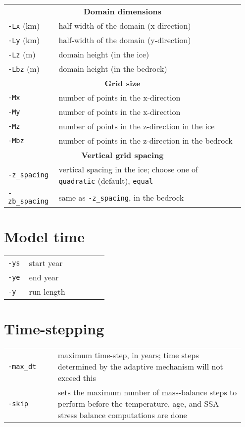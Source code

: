 \documentclass[landscape]{article}
\newcommand{\tabletitle}[1]{\multicolumn{2}{c}{\textbf{#1}}}
\begin{document}
\begin{textblock}{15}
\begin{tabular}{@{}p{0.2\linewidth}p{0.75\linewidth}@{}}
\tabletitle{Domain dimensions} \\
 \texttt{-Lx} (km) & half-width of the domain \mbox{(x-direction)}\\
  \texttt{-Ly} (km) & half-width of the domain \mbox{(y-direction)}\\
  \texttt{-Lz} (m) & domain height (in the ice)\\
  \texttt{-Lbz} (m) & domain height (in the bedrock)\\
\tabletitle{Grid size} \\
 \texttt{-Mx} & number of points in the x-direction\\
  \texttt{-My} & number of points in the x-direction\\
  \texttt{-Mz} & number of points in the z-direction in the ice\\
  \texttt{-Mbz} & number of points in the z-direction in the bedrock\\
\tabletitle{Vertical grid spacing} \\
 \texttt{-z_spacing} & vertical spacing in the ice; choose one of \texttt{quadratic} (default), \texttt{equal}\\
  \texttt{-zb_spacing} & same as \texttt{-z_spacing}, in the bedrock\\
\end{tabular}

\section{Model time}
\label{sec:model-time}
\begin{tabular}{@{}p{0.2\linewidth}p{0.75\linewidth}@{}}
  \texttt{-ys} & start year \\
  \texttt{-ye} & end year \\
  \texttt{-y} & run length
\end{tabular}

\section{Time-stepping}
\label{sec:time-stepping}
\begin{tabular}{@{}p{0.2\linewidth}p{0.75\linewidth}@{}}
  \texttt{-max_dt} & maximum time-step, in years; time steps determined by
  the adaptive mechanism will not exceed this\\
  \texttt{-skip} &  sets the maximum number of mass-balance steps to perform
  before the temperature, age, and SSA stress balance computations
  are done\\
\end{tabular}



\end{textblock}
\end{document}
